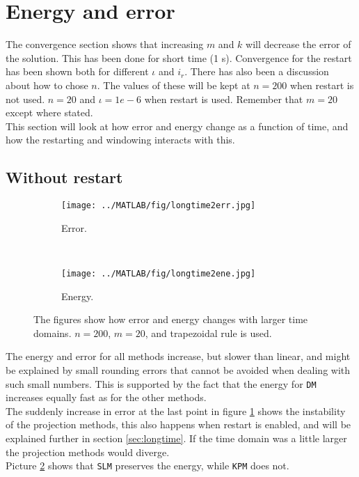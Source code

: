 \section{ Energy and error }%
\label{sec:resultconsterergy}
The convergence section shows that increasing $m$ and $k$ will decrease the error of the solution. This has been done for short time (1 s). Convergence for the restart has been shown both for different $\iota$ and $i_r$. There has also been a discussion about how to chose $n$. The values of these will be kept at $n = 200$ when restart is not used. $n = 20$ and $\iota = 1e-6$ when restart is used. Remember that $m = 20$ except where stated. \\This section will look at how error and energy change as a function of time, and how the restarting and windowing interacts with this.


\subsection{Without restart} %

\begin{figure}[H]
        \centering
        \begin{subfigure}[b]{0.45\textwidth}
                \texttt{[image: ../MATLAB/fig/longtime2err.jpg]}
                \caption{ Error. }
                \label{fig:longtime2err}
        \end{subfigure}
        ~
        \begin{subfigure}[b]{0.45\textwidth}
                \texttt{[image: ../MATLAB/fig/longtime2ene.jpg]}
                \caption{ Energy. }
                \label{fig:longtime8err}
        \end{subfigure}
        \caption{ The figures show how error and energy changes with larger time domains. $n = 200$, $m = 20$, and trapezoidal rule is used. }
        \label{fig:SLMenergyerror0}
\end{figure}
The energy and error for all methods increase, but slower than linear, and might be explained by small rounding errors that cannot be avoided when dealing with such small numbers. This is supported by the fact that the energy for \texttt{DM} increases equally fast as for the other methods. \\
The suddenly increase in error at the last point in figure \ref{fig:longtime2err} shows the instability of the projection methods, this also happens when restart is enabled, and will be explained further in section \ref{sec:longtime}. If the time domain was a little larger the projection methods would diverge. \\
Picture \ref{fig:longtime8err} shows that \texttt{SLM} preserves the energy, while \texttt{KPM} does not.

